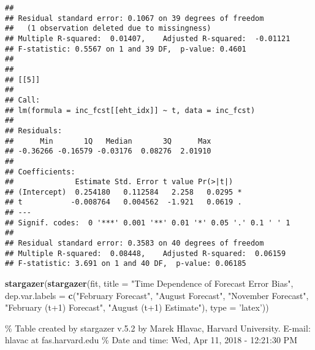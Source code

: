 \documentclass[]{article}
\newenvironment{Shaded}{\begin{snugshade}}{\end{snugshade}}
\newcommand{\DataTypeTok}[1]{\textcolor[rgb]{0.13,0.29,0.53}{#1}}
\newcommand{\KeywordTok}[1]{\textcolor[rgb]{0.13,0.29,0.53}{\textbf{#1}}}
\newcommand{\NormalTok}[1]{#1}
\newcommand{\StringTok}[1]{\textcolor[rgb]{0.31,0.60,0.02}{#1}}
\begin{document}
\begin{verbatim}
## 
## Residual standard error: 0.1067 on 39 degrees of freedom
##   (1 observation deleted due to missingness)
## Multiple R-squared:  0.01407,    Adjusted R-squared:  -0.01121 
## F-statistic: 0.5567 on 1 and 39 DF,  p-value: 0.4601
## 
## 
## [[5]]
## 
## Call:
## lm(formula = inc_fcst[[eht_idx]] ~ t, data = inc_fcst)
## 
## Residuals:
##      Min       1Q   Median       3Q      Max 
## -0.36266 -0.16579 -0.03176  0.08276  2.01910 
## 
## Coefficients:
##              Estimate Std. Error t value Pr(>|t|)  
## (Intercept)  0.254180   0.112584   2.258   0.0295 *
## t           -0.008764   0.004562  -1.921   0.0619 .
## ---
## Signif. codes:  0 '***' 0.001 '**' 0.01 '*' 0.05 '.' 0.1 ' ' 1
## 
## Residual standard error: 0.3583 on 40 degrees of freedom
## Multiple R-squared:  0.08448,    Adjusted R-squared:  0.06159 
## F-statistic: 3.691 on 1 and 40 DF,  p-value: 0.06185
\end{verbatim}

\begin{Shaded}
\begin{Highlighting}[]
\KeywordTok{stargazer}\NormalTok{(}\KeywordTok{stargazer}\NormalTok{(fit, }\DataTypeTok{title =} \StringTok{"Time Dependence of Forecast Error Bias"}\NormalTok{,}
          \DataTypeTok{dep.var.labels =} \KeywordTok{c}\NormalTok{(}\StringTok{"February Forecast"}\NormalTok{, }\StringTok{"August Forecast"}\NormalTok{, }
                             \StringTok{"November Forecast"}\NormalTok{, }\StringTok{"February (t+1) Forecast"}\NormalTok{, }
                             \StringTok{"August (t+1) Estimate"}\NormalTok{), }\DataTypeTok{type =} \StringTok{'latex'}\NormalTok{))}
\end{Highlighting}
\end{Shaded}

\% Table created by stargazer v.5.2 by Marek Hlavac, Harvard University.
E-mail: hlavac at fas.harvard.edu \% Date and time: Wed, Apr 11, 2018 -
12:21:30 PM
\end{document}
